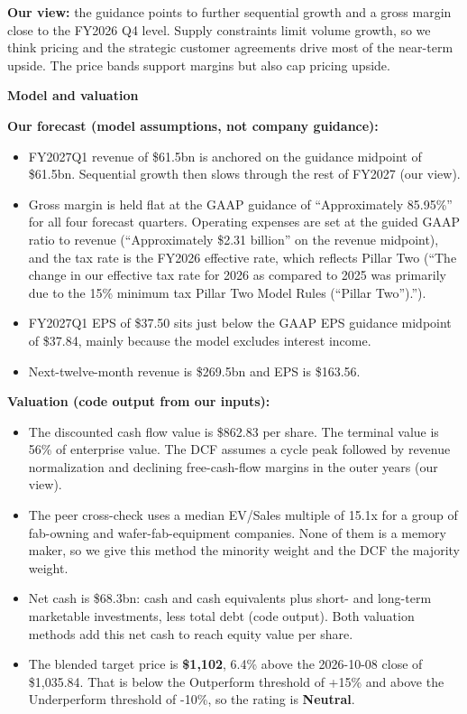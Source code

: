 \documentclass[a4paper,10pt]{article}
\begin{document}
\textbf{Our view:} the guidance points to further sequential growth and a gross margin close to the FY2026 Q4 level. Supply constraints limit volume growth, so we think pricing and the strategic customer agreements drive most of the near-term upside. The price bands support margins but also cap pricing upside.

\par\smallskip\textbf{\color{MemoBlue}Model and valuation}\par

\textbf{Our forecast (model assumptions, not company guidance):}

\begin{itemize}\setlength{\itemsep}{1pt}
\item FY2027Q1 revenue of \$61.5bn is anchored on the guidance midpoint of \$61.5bn. Sequential growth then slows through the rest of FY2027 (our view).
\item Gross margin is held flat at the GAAP guidance of “Approximately 85.95\%” for all four forecast quarters. Operating expenses are set at the guided GAAP ratio to revenue (“Approximately \$2.31 billion” on the revenue midpoint), and the tax rate is the FY2026 effective rate, which reflects Pillar Two (“The change in our effective tax rate for 2026 as compared to 2025 was primarily due to the 15\% minimum tax Pillar Two Model Rules (“Pillar Two”).”).
\item FY2027Q1 EPS of \$37.50 sits just below the GAAP EPS guidance midpoint of \$37.84, mainly because the model excludes interest income.
\item Next-twelve-month revenue is \$269.5bn and EPS is \$163.56.
\end{itemize}

\textbf{Valuation (code output from our inputs):}

\begin{itemize}\setlength{\itemsep}{1pt}
\item The discounted cash flow value is \$862.83 per share. The terminal value is 56\% of enterprise value. The DCF assumes a cycle peak followed by revenue normalization and declining free-cash-flow margins in the outer years (our view).
\item The peer cross-check uses a median EV/Sales multiple of 15.1x for a group of fab-owning and wafer-fab-equipment companies. None of them is a memory maker, so we give this method the minority weight and the DCF the majority weight.
\item Net cash is \$68.3bn: cash and cash equivalents plus short- and long-term marketable investments, less total debt (code output). Both valuation methods add this net cash to reach equity value per share.
\item The blended target price is \textbf{\$1,102}, 6.4\% above the 2026-10-08 close of \$1,035.84. That is below the Outperform threshold of +15\% and above the Underperform threshold of -10\%, so the rating is \textbf{Neutral}.
\end{itemize}
\end{document}
